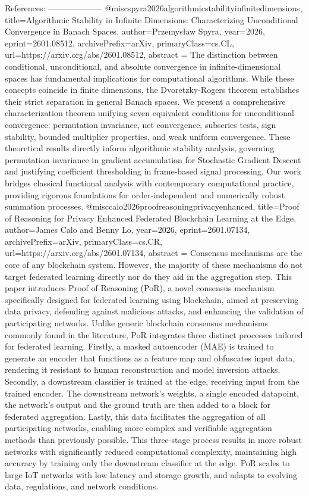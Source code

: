         References:
        --------------------
        @misc{spyra2026algorithmicstabilityinfinitedimensions,
      title={Algorithmic Stability in Infinite Dimensions: Characterizing Unconditional Convergence in Banach Spaces}, 
      author={Przemysław Spyra},
      year={2026},
      eprint={2601.08512},
      archivePrefix={arXiv},
      primaryClass={cs.CL},
      url={https://arxiv.org/abs/2601.08512},
      abstract = {The distinction between conditional, unconditional, and absolute convergence in infinite-dimensional spaces has fundamental implications for computational algorithms. While these concepts coincide in finite dimensions, the Dvoretzky-Rogers theorem establishes their strict separation in general Banach spaces. We present a comprehensive characterization theorem unifying seven equivalent conditions for unconditional convergence: permutation invariance, net convergence, subseries tests, sign stability, bounded multiplier properties, and weak uniform convergence. These theoretical results directly inform algorithmic stability analysis, governing permutation invariance in gradient accumulation for Stochastic Gradient Descent and justifying coefficient thresholding in frame-based signal processing. Our work bridges classical functional analysis with contemporary computational practice, providing rigorous foundations for order-independent and numerically robust summation processes.}
}@misc{calo2026proofreasoningprivacyenhanced,
      title={Proof of Reasoning for Privacy Enhanced Federated Blockchain Learning at the Edge}, 
      author={James Calo and Benny Lo},
      year={2026},
      eprint={2601.07134},
      archivePrefix={arXiv},
      primaryClass={cs.CR},
      url={https://arxiv.org/abs/2601.07134},
      abstract = {Consensus mechanisms are the core of any blockchain system. However, the majority of these mechanisms do not target federated learning directly nor do they aid in the aggregation step. This paper introduces Proof of Reasoning (PoR), a novel consensus mechanism specifically designed for federated learning using blockchain, aimed at preserving data privacy, defending against malicious attacks, and enhancing the validation of participating networks. Unlike generic blockchain consensus mechanisms commonly found in the literature, PoR integrates three distinct processes tailored for federated learning. Firstly, a masked autoencoder (MAE) is trained to generate an encoder that functions as a feature map and obfuscates input data, rendering it resistant to human reconstruction and model inversion attacks. Secondly, a downstream classifier is trained at the edge, receiving input from the trained encoder. The downstream network's weights, a single encoded datapoint, the network's output and the ground truth are then added to a block for federated aggregation. Lastly, this data facilitates the aggregation of all participating networks, enabling more complex and verifiable aggregation methods than previously possible. This three-stage process results in more robust networks with significantly reduced computational complexity, maintaining high accuracy by training only the downstream classifier at the edge. PoR scales to large IoT networks with low latency and storage growth, and adapts to evolving data, regulations, and network conditions.}
}
